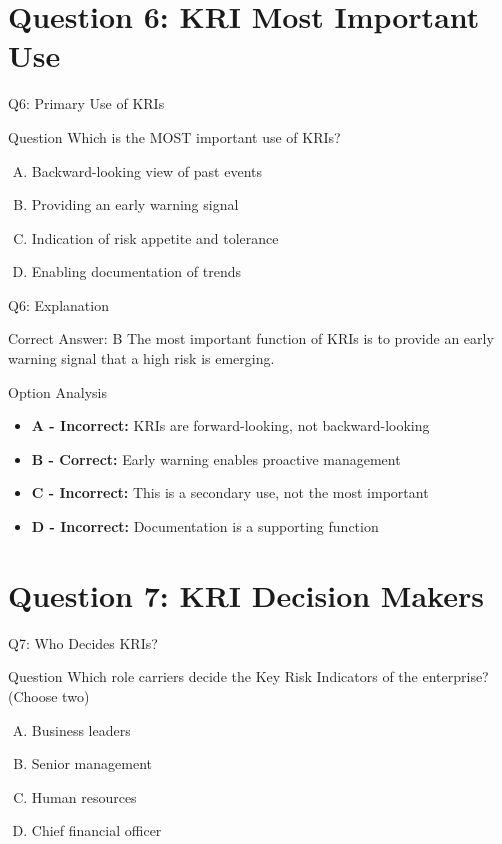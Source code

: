 \documentclass{beamer}
\begin{document}
	\section{Question 6: KRI Most Important Use}
	
	\begin{frame}{Q6: Primary Use of KRIs}
		\begin{block}{Question}
			Which is the MOST important use of KRIs?
		\end{block}
		\begin{enumerate}[(A)]
			\item Backward-looking view of past events
			\item Providing an early warning signal
			\item Indication of risk appetite and tolerance
			\item Enabling documentation of trends
		\end{enumerate}
	\end{frame}
	
	\begin{frame}{Q6: Explanation}
		\begin{block}{Correct Answer: B}
			The most important function of KRIs is to provide an early warning signal that a high risk is emerging.
		\end{block}
		\begin{block}{Option Analysis}
			\begin{itemize}
				\item \textbf{A - Incorrect:} KRIs are forward-looking, not backward-looking
				\item \textbf{B - Correct:} Early warning enables proactive management
				\item \textbf{C - Incorrect:} This is a secondary use, not the most important
				\item \textbf{D - Incorrect:} Documentation is a supporting function
			\end{itemize}
		\end{block}
	\end{frame}
	
	\section{Question 7: KRI Decision Makers}
	
	\begin{frame}{Q7: Who Decides KRIs?}
		\begin{block}{Question}
			Which role carriers decide the Key Risk Indicators of the enterprise? (Choose two)
		\end{block}
		\begin{enumerate}[(A)]
			\item Business leaders
			\item Senior management
			\item Human resources
			\item Chief financial officer
		\end{enumerate}
	\end{frame}
	
\end{document}
